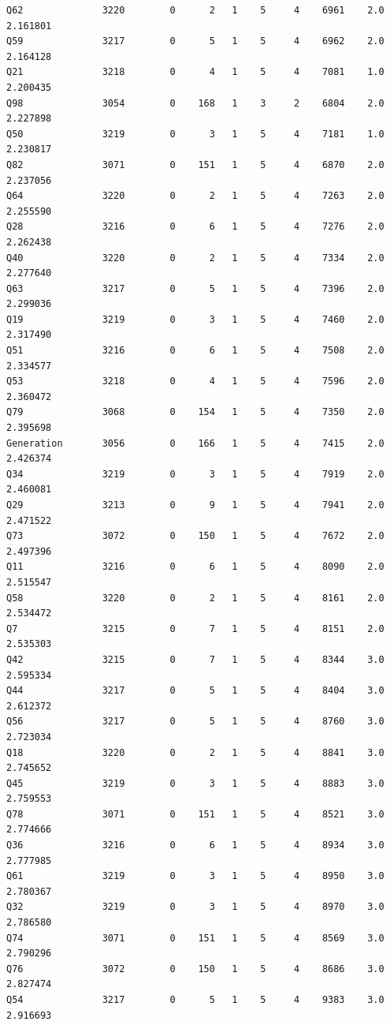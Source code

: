 \documentclass[
]{report}
\begin{document}
\begin{verbatim}
Q62              3220        0      2   1    5     4    6961    2.0    2.161801
Q59              3217        0      5   1    5     4    6962    2.0    2.164128
Q21              3218        0      4   1    5     4    7081    1.0    2.200435
Q98              3054        0    168   1    3     2    6804    2.0    2.227898
Q50              3219        0      3   1    5     4    7181    1.0    2.230817
Q82              3071        0    151   1    5     4    6870    2.0    2.237056
Q64              3220        0      2   1    5     4    7263    2.0    2.255590
Q28              3216        0      6   1    5     4    7276    2.0    2.262438
Q40              3220        0      2   1    5     4    7334    2.0    2.277640
Q63              3217        0      5   1    5     4    7396    2.0    2.299036
Q19              3219        0      3   1    5     4    7460    2.0    2.317490
Q51              3216        0      6   1    5     4    7508    2.0    2.334577
Q53              3218        0      4   1    5     4    7596    2.0    2.360472
Q79              3068        0    154   1    5     4    7350    2.0    2.395698
Generation       3056        0    166   1    5     4    7415    2.0    2.426374
Q34              3219        0      3   1    5     4    7919    2.0    2.460081
Q29              3213        0      9   1    5     4    7941    2.0    2.471522
Q73              3072        0    150   1    5     4    7672    2.0    2.497396
Q11              3216        0      6   1    5     4    8090    2.0    2.515547
Q58              3220        0      2   1    5     4    8161    2.0    2.534472
Q7               3215        0      7   1    5     4    8151    2.0    2.535303
Q42              3215        0      7   1    5     4    8344    3.0    2.595334
Q44              3217        0      5   1    5     4    8404    3.0    2.612372
Q56              3217        0      5   1    5     4    8760    3.0    2.723034
Q18              3220        0      2   1    5     4    8841    3.0    2.745652
Q45              3219        0      3   1    5     4    8883    3.0    2.759553
Q78              3071        0    151   1    5     4    8521    3.0    2.774666
Q36              3216        0      6   1    5     4    8934    3.0    2.777985
Q61              3219        0      3   1    5     4    8950    3.0    2.780367
Q32              3219        0      3   1    5     4    8970    3.0    2.786580
Q74              3071        0    151   1    5     4    8569    3.0    2.790296
Q76              3072        0    150   1    5     4    8686    3.0    2.827474
Q54              3217        0      5   1    5     4    9383    3.0    2.916693

\end{verbatim}
\end{document}
